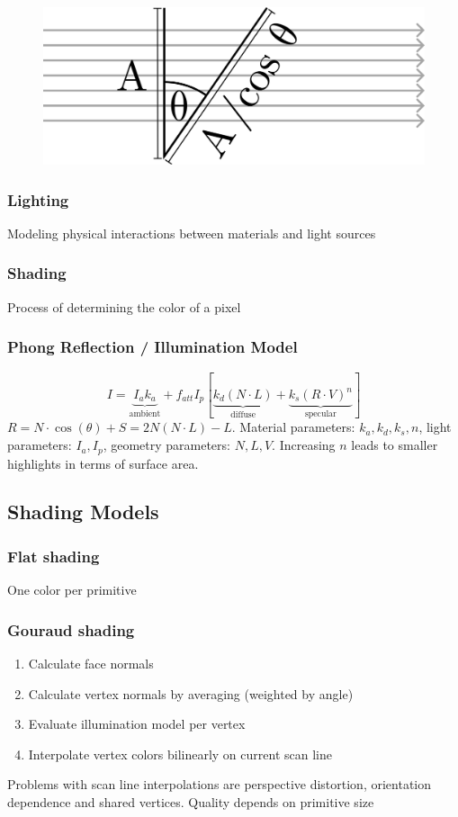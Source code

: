 \documentclass[a4paper,10pt]{article}
\begin{document}
\begin{figure}[ht]
    \centering
    \includegraphics[width=0.4\linewidth]{lamberts-law.png}
\end{figure}
\subsubsection{Lighting} Modeling physical interactions between materials and light sources
\subsubsection{Shading} Process of determining the color of a pixel
\subsubsection{Phong Reflection / Illumination Model} 
\[
    I = \underbrace{I_a k_a}_{\text{ambient}} + f_{att} I_p [\underbrace{k_d(N\cdot L)}_{\text{diffuse}} + \underbrace{k_s(R\cdot V)^n}_{\text{specular}}]
\] 
\( R = N \cdot \cos (\theta) + S = 2N(N\cdot L) - L \).
Material parameters: \( k_a, k_d, k_s, n \),
light parameters: \( I_a, I_p \),
geometry parameters: \( N, L, V \). Increasing \( n \) leads to smaller highlights in terms of surface area. 

\subsection{Shading Models}
\subsubsection{Flat shading} One color per primitive
\subsubsection{Gouraud shading}
\begin{enumerate}
    \item Calculate face normals
    \item Calculate vertex normals by averaging (weighted by angle)
    \item Evaluate illumination model per vertex
    \item Interpolate vertex colors bilinearly on current scan line
\end{enumerate}
Problems with scan line interpolations are perspective distortion, orientation dependence and shared vertices. Quality depends on primitive size
\end{document}
